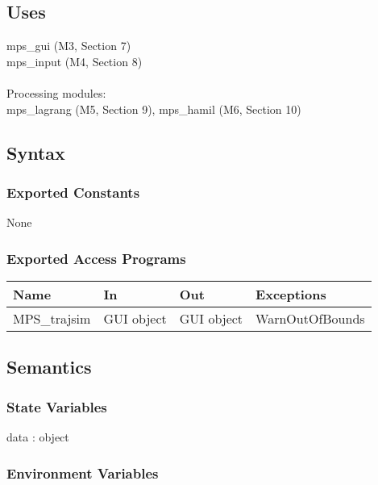 \documentclass[12pt, titlepage]{article}
\begin{document}
\subsection{Uses}

mps\_gui (M3, Section 7)\\
mps\_input (M4, Section 8)\\\\
Processing modules:\\
mps\_lagrang (M5, Section 9), mps\_hamil (M6, Section 10)\\

\subsection{Syntax}

\subsubsection{Exported Constants}

None

\subsubsection{Exported Access Programs}

\begin{center}
\begin{tabular}{p{2cm} p{4cm} p{4cm} p{2cm}}
\hline
\textbf{Name} & \textbf{In} & \textbf{Out} & \textbf{Exceptions} \\
\hline
MPS\_trajsim & GUI object & GUI object & WarnOutOfBounds \\
\hline
\end{tabular}
\end{center}

\subsection{Semantics}

\subsubsection{State Variables}

data : object

\subsubsection{Environment Variables}
\end{document}
